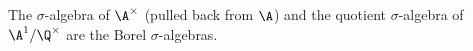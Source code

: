 The $\sigma$-algebra of $\A^\times$ (pulled back from $\A$) and the quotient $\sigma$-algebra of $\A^1/\Q^\times$ are the Borel $\sigma$-algebras.
